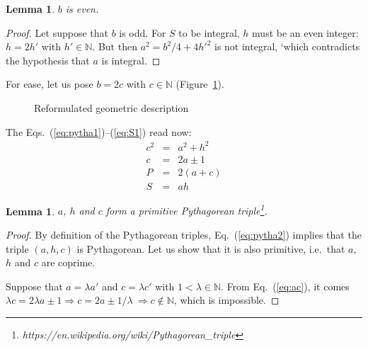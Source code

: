 \documentclass[11pt, twoside, a4paper]{article}
\newtheorem{lemma}[theorem]{Lemma}
\newcommand{\Figure}[1]{Figure~\ref{#1}}
\newcommand{\Eq}[1]{Eq.~(\ref{#1})}
\newcommand{\Eqs}[2]{Eqs.~(\ref{#1})--(\ref{#2})}
\newcommand{\set}[1]{\mathbb{#1}}
\begin{document}
\begin{lemma}$b$ is even.\end{lemma}
\begin{proof} Let suppose that $b$ is odd. For $S$ to be integral, $h$ must be an even integer: $h=2h'$ with $h'\in\set N$. But then $a^2 = b^2/4 + 4h'^2$ is not integral, `which contradicts the hypothesis that $a$ is integral.
\end{proof}

For ease, let us pose $b=2c$ with $c\in\set N$ (\Figure{fig:triangle2}). 
\begin{figure}
    \begin{center}
        \caption{Reformulated geometric description}
        \label{fig:triangle2}
    \end{center}
\end{figure}

The \Eqs{eq:pytha1}{eq:S1} read now:
\begin{eqnarray}
c^2 & = & a^2 + h^2 \\ \label{eq:pytha2}
  c & = & 2a \pm 1 \\ \label{eq:ac}
  P & = & 2(a+c) \\ 
  S & = & ah \label{eq:S2}
\end{eqnarray}


\begin{lemma}$a$, $h$ and $c$ form a primitive Pythagorean triple\footnote{https://en.wikipedia.org/wiki/Pythagorean\_triple}.\end{lemma}

\begin{proof} 
	By definition of the Pythagorean triples, \Eq{eq:pytha2} implies that the triple $(a, h, c)$ is Pythagorean. Let us show that it is also primitive, i.e.\ that $a$, $h$ and $c$ are coprime.
		
	Suppose that $a=\lambda a'$ and $c=\lambda c'$ with $1<\lambda\in\set N$. From \Eq{eq:ac}, it comes $\lambda c = 2 \lambda a \pm 1 \Rightarrow c = 2 a \pm 1/\lambda\ \Rightarrow c \not\in\set N$, which is impossible. 
\end{proof}
\end{document}
